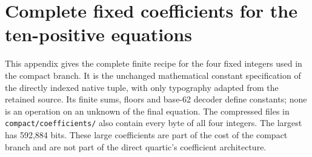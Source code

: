 \documentclass[11pt]{article}
\theoremstyle{definition}\newtheorem{definition}[theorem]{Definition}
\theoremstyle{remark}\newtheorem{remark}[theorem]{Remark}
\newcommand{\code}[1]{\nolinkurl{#1}}
\begin{document}

\clearpage
\section{Complete fixed coefficients for the ten-positive equations}\label{app:constants}

This appendix gives the complete finite recipe for the four fixed integers used in the compact branch. It is the unchanged mathematical constant specification of the directly indexed native tuple, with only typography adapted from the retained source. Its finite sums, floors and base-62 decoder define constants; none is an operation on an unknown of the final equation. The compressed files in \code{compact/coefficients/} also contain every byte of all four integers. The largest has 592,884 bits. These large coefficients are part of the cost of the compact branch and are not part of the direct quartic's coefficient architecture.


\end{document}
